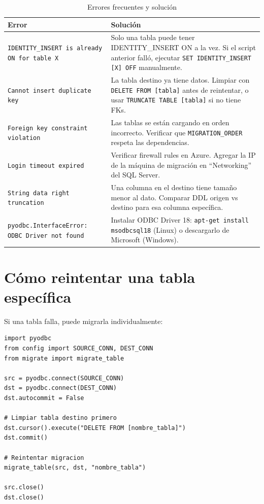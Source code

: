 \documentclass[12pt,a4paper,twoside]{report}
\begin{document}
\begin{longtable}{p{5cm}p{9cm}}
\caption{Errores frecuentes y soluci\'on} \\
\toprule
\textbf{Error} & \textbf{Soluci\'on} \\
\midrule
\endfirsthead
\endhead
\texttt{IDENTITY\_INSERT is already ON for table X} &
Solo una tabla puede tener IDENTITY\_INSERT ON a la vez. Si el script anterior fall\'o, ejecutar \texttt{SET IDENTITY\_INSERT [X] OFF} manualmente. \\
\addlinespace
\texttt{Cannot insert duplicate key} &
La tabla destino ya tiene datos. Limpiar con \texttt{DELETE FROM [tabla]} antes de reintentar, o usar \texttt{TRUNCATE TABLE [tabla]} si no tiene FKs. \\
\addlinespace
\texttt{Foreign key constraint violation} &
Las tablas se est\'an cargando en orden incorrecto. Verificar que \texttt{MIGRATION\_ORDER} respeta las dependencias. \\
\addlinespace
\texttt{Login timeout expired} &
Verificar firewall rules en Azure. Agregar la IP de la m\'aquina de migraci\'on en ``Networking'' del SQL Server. \\
\addlinespace
\texttt{String data right truncation} &
Una columna en el destino tiene tama\~no menor al dato. Comparar DDL origen vs destino para esa columna espec\'ifica. \\
\addlinespace
\texttt{pyodbc.InterfaceError: ODBC Driver not found} &
Instalar ODBC Driver 18: \texttt{apt-get install msodbcsql18} (Linux) o descargarlo de Microsoft (Windows). \\
\bottomrule
\end{longtable}

\section{C\'omo reintentar una tabla espec\'ifica}

Si una tabla falla, puede migrarla individualmente:

\begin{lstlisting}[style=pythonstyle]
import pyodbc
from config import SOURCE_CONN, DEST_CONN
from migrate import migrate_table

src = pyodbc.connect(SOURCE_CONN)
dst = pyodbc.connect(DEST_CONN)
dst.autocommit = False

# Limpiar tabla destino primero
dst.cursor().execute("DELETE FROM [nombre_tabla]")
dst.commit()

# Reintentar migracion
migrate_table(src, dst, "nombre_tabla")

src.close()
dst.close()
\end{lstlisting}
\end{document}
